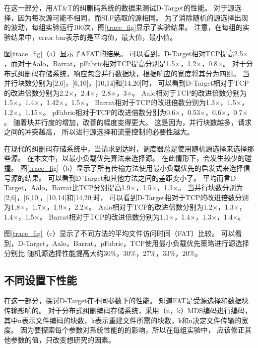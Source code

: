 在这一部分，用AT\&T的纠删码系统的数据来测试D-Target的性能。
对于源选择，因为每次源可能不相同，而SLF选取的源相同。
为了消除随机的源选择出现的波动，每组实验运行100次，图\ref{trace_fig}显示了实验结果。
注意，在每组的实验结果中，error bar表示的是平均值，最大值，最小值。


图\ref{trace_fig}（a）显示了AFAT的结果。
可以看到，D-Target相对TCP提高2.5$\times$，而对于Aalo，Barrat，pFabric相对TCP提高分别是1.5$\times$，1.2$\times$，0.8$\times$。
对于分布式纠删码存储系统，响应包含并行数据块，根据响应的宽度将其分为四组。
当并行块数分别为[2,6]，[6,10]，[10,14]和[14,20]时，
可以看到D-Target相对于TCP的改进倍数分别为2.2$\times$，2.4$\times$，2.8$\times$，3$\times$。
Aalo相对于TCP的改进倍数分别为1.5$\times$，1.4$\times$，1.42$\times$，1.5$\times$。
Barrat相对于TCP的改进倍数分别为1.3$\times$，1.5$\times$，1.2$\times$，1.15$\times$。
pFabric相对于TCP的改进倍数分别为0.6$\times$，0.53$\times$，0.6$\times$，0.7$\times$。
随着块并行度的增加，改善的幅度变得更大。
这是因为，并行块数越多，请求之间的冲突越高，
所以进行源选择和流量控制的必要性越大。

在现代的纠删码存储系统中，当请求到达时，调度器总是使用随机源选择来选择那些源。
在本文中，以最小负载优先算法来选择源。
在此情形下，会发生较少的碰撞。
图\ref{trace_fig}（b）显示了所有传输方法使用最小负载优先的启发式来选择信号源的结果。
可以看到D-Target和其他方法之间的差距变小了。
平均而言D-Target，Aalo，Barrat比TCP分别提高1.9$\times$，1.5$\times$，1.3$\times$。
当并行块数分别为[2,6]，[6,10]，[10,14]和[14,20]时，
可以看到D-Target相对于TCP的改进倍数分别为1.8$\times$，1.7$\times$，1.9$\times$，2.2$\times$。
Aalo相对于TCP的改进倍数分别为1.2$\times$，1.3$\times$，1.4$\times$，1.5$\times$。
Barrat相对于TCP的改进倍数分别为1.1$\times$，1.4$\times$，1.3$\times$，1.4$\times$。

图\ref{trace_fig}（c）显示了不同方法的平均文件访问时间（FAT）比较。
可以看到，D-Target，Aalo，Barrat，pFabric，TCP使用最小负载优先策略进行源选择分别比
随机源选择性能提高大约$30\%$，$30\%$，$27\%$，$33\%$，$20\%$。



\subsection{不同设置下性能}
在这一部分，探讨D-Target在不同参数下的性能。
知道FAT是受源选择和数据块传输影响的。
对于分布式纠删编码存储系统，采用（n，k）MDS编码进行编码，
其中n表示文件编码的块数，k表示重建文件所需的块数，k和n决定文件传输的宽度。
因为要探索每个参数对系统性能的的影响，所以在每组实验中，
应该修正其他参数的值，只改变想研究的因素。

